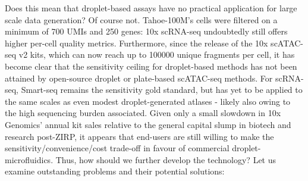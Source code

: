 Does this mean that droplet-based assays have no practical application for large scale data generation? Of course not. Tahoe-100M's cells were filtered on a minimum of 700 UMIs and 250 genes: 10x scRNA-seq undoubtedly still offers higher per-cell quality metrics. Furthermore, since the release of the 10x scATAC-seq v2 kits, which can now reach up to \num{100000} unique fragments per cell, it has become clear that the sensitivity ceiling for droplet-based methods has not been attained by open-source droplet or plate-based scATAC-seq methods. For scRNA-seq, Smart-seq remains the sensitivity gold standard, but has yet to be applied to the same scales as even modest droplet-generated atlases - likely also owing to the high sequencing burden associated. Given only a small slowdown in 10x Genomics' annual kit sales relative to the general capital slump in biotech and research post-ZIRP, it appears that end-users are still willing to make the sensitivity/convenience/cost trade-off in favour of commercial droplet-microfluidics. Thus, how should we further develop the technology? Let us examine outstanding problems and their potential solutions:

